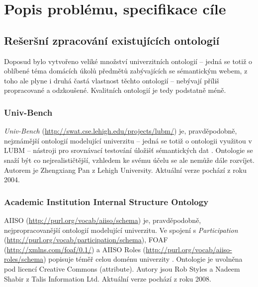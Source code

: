 
\chapter{Popis problému, specifikace cíle}
% 
% 

\section{Rešeršní zpracování existujících ontologií}
Doposud bylo vytvořeno veliké množství univerzitních ontologií -- jedná se totiž o oblíbené téma domácích úkolů předmětů zabývajících se sémantickým webem, z toho ale plyne i druhá častá vlastnost těchto ontologií -- nebývají příliš propracované a odzkoušené. Kvalitních ontologií je tedy podstatně méně.

\subsection{Univ-Bench}
\emph{Univ-Bench} (\url{http://swat.cse.lehigh.edu/projects/lubm/}) je, pravděpodobně, nejznámější ontologií modelující univerzitu -- jedná se totiž o ontologii využitou v \gls{LUBM} -- nástroji pro srovnávací testování úložišť sémantických dat \cite{Lubm}. Ontologie se snaží být co nejrealističtější, vzhledem ke svému účelu se ale nemůže dále rozvíjet. Autorem je Zhengxiang Pan z Lehigh University. Aktuální verze pochází z roku 2004.

\subsection{Academic Institution Internal Structure Ontology}
\Gls{AIISO} (\url{http://purl.org/vocab/aiiso/schema}) je, pravděpodobně, nejpropracovanější ontologií modelující univerzitu. Ve spojení s \emph{Participation} (\url{http://purl.org/vocab/participation/schema}), \gls{FOAF} (\url{http://xmlns.com/foaf/0.1/}) a \gls{AIISO} Roles (\url{http://purl.org/vocab/aiiso-roles/schema}) popisuje téměř celou doménu univerzity \cite{Aiiso}. Ontologie je uvolněna pod licencí Creative Commons (attribute). Autory jsou Rob Styles a Nadeem Shabir z Talis Information Ltd. Aktuální verze pochází z roku 2008.

